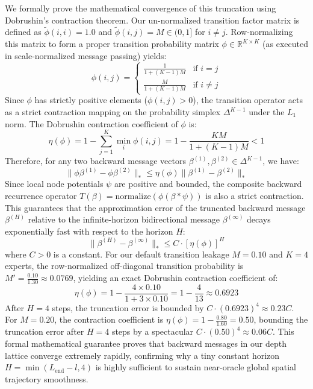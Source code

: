 \begin{itemize}
    We formally prove the mathematical convergence of this truncation using Dobrushin's contraction theorem. Our un-normalized transition factor matrix is defined as $\tilde{\phi}(i, i) = 1.0$ and $\tilde{\phi}(i, j) = M \in (0, 1]$ for $i \ne j$. Row-normalizing this matrix to form a proper transition probability matrix $\phi \in \mathbb{R}^{K \times K}$ (as executed in scale-normalized message passing) yields:
    \begin{equation}
        \phi(i, j) = \begin{cases} \frac{1}{1 + (K-1)M} & \text{if } i = j \\ \frac{M}{1 + (K-1)M} & \text{if } i \ne j \end{cases}
    \end{equation}
    Since $\phi$ has strictly positive elements ($\phi(i, j) > 0$), the transition operator acts as a strict contraction mapping on the probability simplex $\Delta^{K-1}$ under the $L_1$ norm. The Dobrushin contraction coefficient of $\phi$ is:
    \begin{equation}
        \eta(\phi) = 1 - \sum_{j=1}^K \min_{i} \phi(i, j) = 1 - \frac{K M}{1 + (K-1)M} < 1
    \end{equation}
    Therefore, for any two backward message vectors $\beta^{(1)}, \beta^{(2)} \in \Delta^{K-1}$, we have:
    \begin{equation}
        \|\phi \beta^{(1)} - \phi \beta^{(2)}\|_* \le \eta(\phi) \|\beta^{(1)} - \beta^{(2)}\|_*
    \end{equation}
    Since local node potentials $\psi$ are positive and bounded, the composite backward recurrence operator $T(\beta) = \text{normalize}(\phi (\beta * \psi))$ is also a strict contraction. This guarantees that the approximation error of the truncated backward message $\beta^{(H)}$ relative to the infinite-horizon bidirectional message $\beta^{(\infty)}$ decays exponentially fast with respect to the horizon $H$:
    \begin{equation}
        \|\beta^{(H)} - \beta^{(\infty)}\|_* \le C \cdot \left[ \eta(\phi) \right]^H
    \end{equation}
    where $C > 0$ is a constant. For our default transition leakage $M = 0.10$ and $K = 4$ experts, the row-normalized off-diagonal transition probability is $M' = \frac{0.10}{1.30} \approx 0.0769$, yielding an exact Dobrushin contraction coefficient of:
    \begin{equation}
        \eta(\phi) = 1 - \frac{4 \times 0.10}{1 + 3 \times 0.10} = 1 - \frac{4}{13} \approx 0.6923
    \end{equation}
    After $H = 4$ steps, the truncation error is bounded by $C \cdot (0.6923)^4 \approx 0.23 C$. For $M = 0.20$, the contraction coefficient is $\eta(\phi) = 1 - \frac{0.80}{1.60} = 0.50$, bounding the truncation error after $H = 4$ steps by a spectacular $C \cdot (0.50)^4 \approx 0.06 C$. This formal mathematical guarantee proves that backward messages in our depth lattice converge extremely rapidly, confirming why a tiny constant horizon $H = \min(L_{\text{end}} - l, 4)$ is highly sufficient to sustain near-oracle global spatial trajectory smoothness.
    

\end{itemize}
